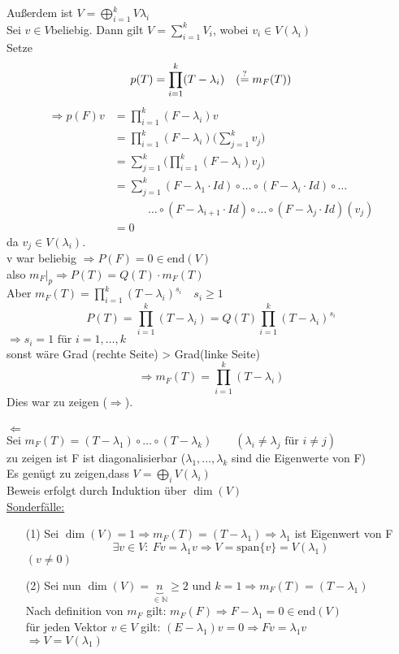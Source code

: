 \documentclass[titlepage,12pt,a4paper,ngerman]{report}
\newcommand{\tx}[1]{\textrm{#1}}
\newcommand{\ub}[1]{\underbrace{#1}}
\newcommand{\spa}{\tx{span}}
\begin{document}
Außerdem ist $ V = \bigoplus\limits_{i=1}^{k} V\lambda_i $\\
Sei $ v\in V $beliebig.  Dann gilt $ V = \sum_{i=1}^{k} V_i $, wobei $ v_i \in V(\lambda_i) $\\
Setze 
$$ p(T) = \prod_{i=1}^{k}(T-\lambda_i) \quad (\buildrel ? \over = m_F(T)) $$
\begin{align*}
\Rightarrow p(F) v &= \prod_{i=1}^{k} (F-\lambda_i) v \\
&= \prod_{i=1}^{k}(F-\lambda_i) \bigg (\sum_{j=1}^{k} v_j \bigg )\\
&= \sum_{j=1}^{k}\bigg( \prod_{i=1}^{k} (F-\lambda_i) v_j \bigg)\\
&= \sum_{j=1}^{k} (F-\lambda_1 \cdot Id) \circ \dots \circ (F-\lambda_i \cdot Id) \circ \dots\\ &\quad \quad \quad \dots \circ (F-\lambda_{i+1} \cdot Id) \circ \dots \circ (F-\lambda_j \cdot Id)(v_j)\\
&= 0
\end{align*}
da $ v_j \in V(\lambda_i) $.\\
v war beliebig $ \Rightarrow P(F) = 0 \in \tx{end}(V) $\\
also $  m_F|_p \Rightarrow P(T) = Q(T) \cdot m_F(T)$\\
Aber $ m_F(T) = \prod_{i=1}^{k}(T-\lambda_i)^{s_i} \quad s_i \ge 1 $\\
$$ P(T) = \prod_{i=1}^{k}(T-\lambda_i) = Q(T) \prod_{i=1}^{k} (T-\lambda_i)^{s_i}$$
$\Rightarrow s_i = 1 \tx{ für } i = 1, \dots , k$\\
sonst wäre Grad (rechte Seite) > Grad(linke Seite)\\
$$ \Rightarrow m_F(T) = \prod_{i=1}^{k} (T-\lambda_i)$$
Dies war zu zeigen ($ \Rightarrow $).\\\\
$ \boxed{\Leftarrow} $\\
Sei $  m_F(T) = (T-\lambda_1)\circ \dots \circ(T-\lambda_k) \qquad (\lambda_i \neq \lambda_j \tx{ für } i \neq j ) $\\
zu zeigen ist F ist diagonalisierbar ($ \lambda_1 , \dots , \lambda_k $ sind die Eigenwerte von F)\\
Es genügt zu zeigen,dass $ V = \bigoplus\limits_{i} V(\lambda_i) $\\
Beweis erfolgt durch Induktion über $ \dim(V) $\\
\underline{Sonderfälle:}
\begin{itemize}
	\item[(1)] Sei $ \dim(V) = 1 \Rightarrow m_F(T) = (T-\lambda_1) \Rightarrow \lambda_1 $ ist Eigenwert von F\\
	$$\exists v \in V: \ F v = \lambda_1 v \Rightarrow V = \spa\{v\} = V(\lambda_1)$$
	$ (v\neq 0) $
	\item[(2)] Sei nun $ \dim(V) = \ub{n}_{\in \mathbb{N}} \ge 2 $ und $  k = 1 \Rightarrow m_F(T) = (T-\lambda_1)$\\
	Nach definition von $ m_F $ gilt: $ m_F(F) \Rightarrow F-\lambda_1 = 0 \in \tx{end}(V) $\\
	für jeden Vektor $ v\in V $ gilt: $ (E-\lambda_1) v = 0 \Rightarrow F v = \lambda_1 v $\\
	$\Rightarrow V = V(\lambda_1)$	
\end{itemize}
\end{document}
